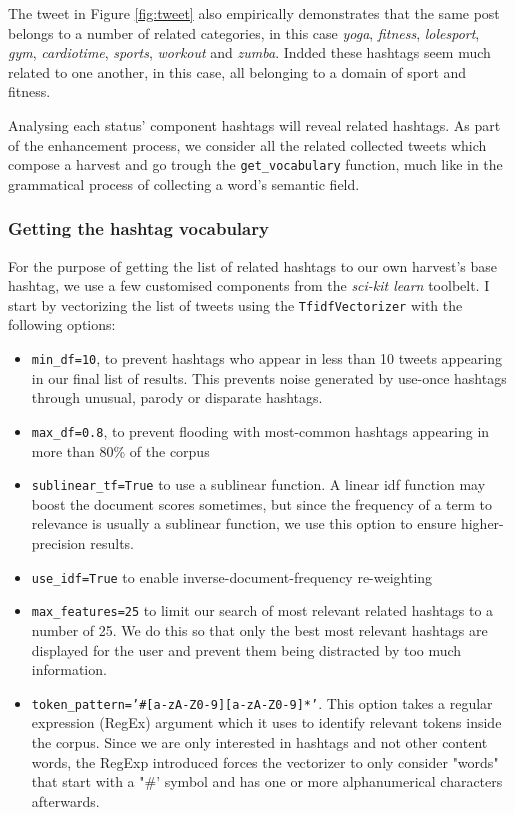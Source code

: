 \documentclass[12pt,a4paper,twoside]{report}
\begin{document}
The tweet in Figure \ref{fig:tweet} also empirically demonstrates that the same post belongs to a number of related categories, in this case \emph{yoga}, \emph{fitness}, \emph{lolesport}, \emph{gym}, \emph{cardiotime}, \emph{sports}, \emph{workout} and \emph{zumba}. Indded these hashtags seem much related to one another, in this case, all belonging to a domain of sport and fitness.

Analysing each status' component hashtags will reveal related hashtags. As part of the enhancement process, we consider all the related collected tweets which compose a harvest and go trough the \texttt{get\_vocabulary} function, much like in the grammatical process of collecting a word's semantic field.

\subsubsection{Getting the hashtag vocabulary}
For the purpose of getting the list of related hashtags to our own harvest's base hashtag, we use a few customised components from the \emph{sci-kit learn} toolbelt. I start by vectorizing the list of tweets using the \texttt{TfidfVectorizer} with the following options:

\begin{itemize}
\item \texttt{min\_df=10}, to prevent hashtags who appear in less than 10 tweets appearing in our final list of results. This prevents noise generated by use-once hashtags through unusual, parody or disparate hashtags.
\item \texttt{max\_df=0.8}, to prevent flooding with most-common hashtags appearing in more than 80\% of the corpus
\item \texttt{sublinear\_tf=True} to use a sublinear function. A linear idf function may boost the document scores sometimes, but since the frequency of a term to relevance is usually a sublinear function, we use this option to ensure higher-precision results.
\item \texttt{use\_idf=True} to enable inverse-document-frequency re-weighting
\item \texttt{max\_features=25} to limit our search of most relevant related hashtags to a number of 25. We do this so that only the best most relevant hashtags are displayed for the user and prevent them being distracted by too much information.
\item \texttt{token\_pattern='\#[a-zA-Z0-9][a-zA-Z0-9]*'}. This option takes a regular expression (RegEx) argument which it uses to identify relevant tokens inside the corpus. Since we are only interested in hashtags and not other content words, the RegExp introduced forces the vectorizer to only consider "words" that start with a "\#' symbol and has one or more alphanumerical characters afterwards.
\end{itemize}
\end{document}

